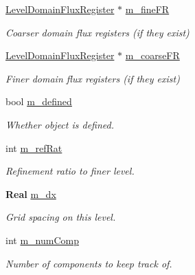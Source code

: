 \begin{DoxyCompactItemize}
\hyperlink{class_level_domain_flux_register}{Level\+Domain\+Flux\+Register} $\ast$ \hyperlink{class_level_domain_flux_register_a1ba404111f25881482c72692c741a01f}{m\+\_\+fine\+FR}
\begin{DoxyCompactList}\small\item\em Coarser domain flux registers (if they exist) \end{DoxyCompactList}\item 
\mbox{\label{class_level_domain_flux_register_a8df7d22f025eac578341eac07921ed19}} 
\hyperlink{class_level_domain_flux_register}{Level\+Domain\+Flux\+Register} $\ast$ \hyperlink{class_level_domain_flux_register_a8df7d22f025eac578341eac07921ed19}{m\+\_\+coarse\+FR}
\begin{DoxyCompactList}\small\item\em Finer domain flux registers (if they exist) \end{DoxyCompactList}\item 
\mbox{\label{class_level_domain_flux_register_a66585e6d5edb8224c53eb8d7ab807557}} 
bool \hyperlink{class_level_domain_flux_register_a66585e6d5edb8224c53eb8d7ab807557}{m\+\_\+defined}
\begin{DoxyCompactList}\small\item\em Whether object is defined. \end{DoxyCompactList}\item 
\mbox{\label{class_level_domain_flux_register_ab0271dd8dfb92a86e67f49ef3a253459}} 
int \hyperlink{class_level_domain_flux_register_ab0271dd8dfb92a86e67f49ef3a253459}{m\+\_\+ref\+Rat}
\begin{DoxyCompactList}\small\item\em Refinement ratio to finer level. \end{DoxyCompactList}\item 
\mbox{\label{class_level_domain_flux_register_a405820000fb0acf93291fc7caa0fdeb0}} 
\textbf{ Real} \hyperlink{class_level_domain_flux_register_a405820000fb0acf93291fc7caa0fdeb0}{m\+\_\+dx}
\begin{DoxyCompactList}\small\item\em Grid spacing on this level. \end{DoxyCompactList}\item 
\mbox{\label{class_level_domain_flux_register_a5c277f9a784ecd31e375160992b08cd6}} 
int \hyperlink{class_level_domain_flux_register_a5c277f9a784ecd31e375160992b08cd6}{m\+\_\+num\+Comp}
\begin{DoxyCompactList}\small\item\em Number of components to keep track of. \end{DoxyCompactList}\end{DoxyCompactItemize}


